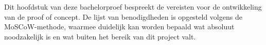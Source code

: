 
\chapter{}%
\label{ch:benodigdheden}

%
%
%
%
%      
%  
%
%
Dit hoofdstuk van deze bachelorproef bespreekt de vereisten voor de ontwikkeling van de proof of concept. De lijst van benodigdheden is opgesteld volgens de MoSCoW-methode, waarmee duidelijk kan worden bepaald wat absoluut noodzakelijk is en wat buiten het bereik van dit project valt.

